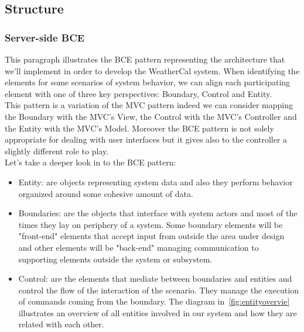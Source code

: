 \subsection{Structure}
\subsubsection{Server-side BCE}\label{sec:BCE}
This paragraph illustrates the BCE pattern representing the architecture that we'll implement in order to develop the WeatherCal system. When identifying the elements for some scenarios of system behavior, we can align each participating element with one of three key perspectives: Boundary, Control and Entity. \\This  pattern is a variation of the MVC pattern indeed we can consider mapping the Boundary with the MVC's View, the Control with the MVC's Controller and the Entity with the MVC's Model. Moreover the BCE pattern is not solely appropriate for dealing with user interfaces but it gives also to the controller a slightly different role to play.\\Let's take a deeper look in to the BCE pattern:\begin{itemize}
\item Entity: are objects representing system data and also they perform behavior organized around some cohesive amount of data.
\item Boundaries: are the objects that interface with system actors and most of the times they lay on periphery of a system. Some boundary elements will be "front-end" elements that accept input from outside the area under design and other elements will be "back-end" managing communication to supporting elements outside the system or subsystem.
\item Control: are the elements that mediate between boundaries and entities and control the flow of the interaction of the scenario. They manage the execution of commands coming from the boundary.
The diagram in~\ref{fig:entityovervie} illustrates an overview of all entities involved in our system and how they are related with each other.
 \begin{center}
 \begin{figure}[H]

\end{figure}
\end{center}
\end{itemize}
